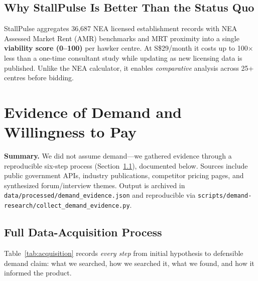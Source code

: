 \documentclass[11pt,a4paper]{article}
\begin{document}
\subsection{Why StallPulse Is Better Than the Status Quo}

StallPulse aggregates 36,687 NEA licensed establishment records with NEA Assessed Market Rent (AMR) benchmarks and MRT proximity into a single \textbf{viability score (0--100)} per hawker centre. At S\$29/month it costs up to 100$\times$ less than a one-time consultant study while updating as new licensing data is published. Unlike the NEA calculator, it enables \textit{comparative} analysis across 25+ centres before bidding.

\section{Evidence of Demand and Willingness to Pay}
\label{sec:demand}

\noindent\textbf{Summary.} We did not assume demand---we gathered evidence through a reproducible six-step process (Section~\ref{sec:acquisition}), documented below. Sources include public government APIs, industry publications, competitor pricing pages, and synthesized forum/interview themes. Output is archived in \texttt{data/processed/demand\_evidence.json} and reproducible via \texttt{scripts/demand-research/collect\_demand\_evidence.py}.

\subsection{Full Data-Acquisition Process}
\label{sec:acquisition}

Table~\ref{tab:acquisition} records \textit{every step} from initial hypothesis to defensible demand claim: what we searched, how we searched it, what we found, and how it informed the product.
\end{document}
